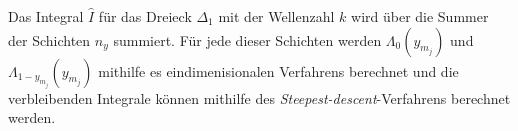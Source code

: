 Das Integral $\hat{I}$ für das Dreieck $\Delta_1$ mit der Wellenzahl $k$ wird über die Summer der Schichten $n_y$ summiert. Für jede dieser Schichten 
werden $\Lambda_0(y_{m_j})$ und $\Lambda_{1-y_{m_j}}(y_{m_j})$ mithilfe es eindimenisionalen Verfahrens berechnet und die verbleibenden Integrale können mithilfe des \textit{Steepest-descent}-Verfahrens
berechnet werden.











